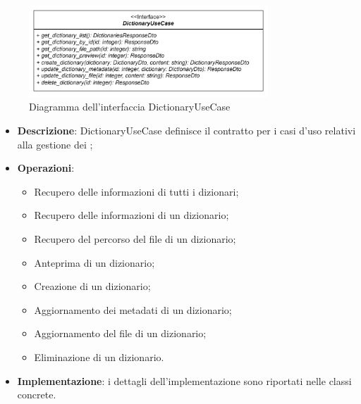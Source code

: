  \label{DictionaryUseCase}
\begin{figure}[H]
    \centering
    \includegraphics[width=0.8\textwidth]{assets/Backend/dictionary_use_case.png}
    \caption{Diagramma dell'interfaccia DictionaryUseCase}
  \end{figure}
\begin{itemize}
    \item \textbf{Descrizione}: DictionaryUseCase definisce il contratto per i casi d'uso relativi alla gestione dei ;
    \item \textbf{Operazioni}:
    \begin{itemize}
      \item Recupero delle informazioni di tutti i dizionari;
      \item Recupero delle informazioni di un dizionario;
      \item Recupero del percorso del file di un dizionario;
      \item Anteprima di un dizionario;
      \item Creazione di un dizionario;
      \item Aggiornamento dei metadati di un dizionario;
      \item Aggiornamento del file di un dizionario;
      \item Eliminazione di un dizionario.
    \end{itemize}
    \item \textbf{Implementazione}: i dettagli dell'implementazione sono riportati nelle classi concrete.
\end{itemize}  

